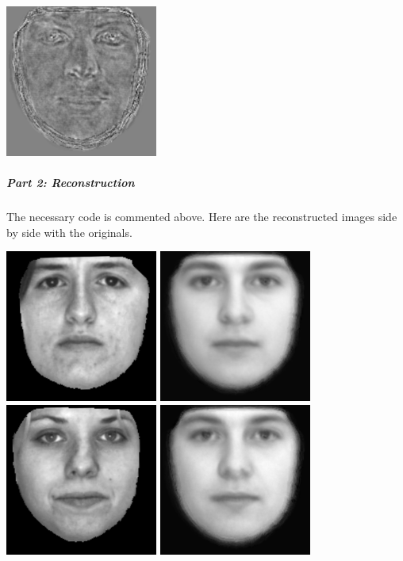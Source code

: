 \documentclass[12pt]{article}
\begin{document}
\begin{center}
    \includegraphics[width=5cm]{output_part1/eigenface_9.png}
    \end{center}
    
    \subparagraph{Part 2: Reconstruction}
    The necessary code is commented above.
    Here are the reconstructed images side by side with the originals.
    \begin{center}
    \includegraphics[width=5cm]{output_part2/original_0.png}
    \includegraphics[width=5cm]{output_part2/reconstruct_0.png}
    \includegraphics[width=5cm]{output_part2/original_1.png}
    \includegraphics[width=5cm]{output_part2/reconstruct_1.png}

\end{center}
\end{document}
